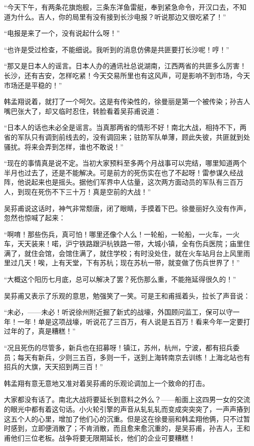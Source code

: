 \par “今天下午，有两条花旗炮舰，三条东洋鱼雷艇，奉到紧急命令，开汉口去，不知道为什么。吉人，你的局里有没有接到长沙电报？听说那边又很吃紧了！”
\par “电报是来了一个，没有说起什么呀！”
\par “也许是受过检查，不能细说。我听到的消息仿佛是共匪要打长沙呢！哼！”
\par “那又是日本人的谣言。日本人办的通讯社总说湖南，江西两省的共匪多么厉害！长沙，还有吉安，怎样吃紧！今天交易所里也有这风声，可是影响不到市场，今天市场还是平稳的！”
\par 韩孟翔说着，就打了一个呵欠。这是有传染性的，徐曼丽是第一个被传染；孙吉人嘴巴张大了，却又临时忍住，转脸看着吴荪甫说道：
\par “日本人的话也未必全是谣言。当真那两省的情形不好！南北大战，相持不下，两省的军队只有调到前线去的，没有调回来；驻防军队单薄，顾此失彼，共匪就到处骚扰。将来会弄到怎样，谁也不敢说！”
\par “现在的事情真是说不定。当初大家预料至多两个月战事可以完结，哪里知道两个半月也过去了，还是不能解决。可是前方的死伤实在也了不起呀！雷参谋久经战阵，他说起来也是摇头。据他们军界中人估量，这次两方面动员的军队有三百万人，到现在死伤不下三十万！真是空前的大战！”
\par 吴荪甫说这话时，神气非常颓唐，闭了眼睛，手摸着下巴。徐曼丽好久没有作声，忽然也惊喊了起来：
\par “啊唷！那些伤兵，真可怕！哪里还像个人么！一轮船，一轮船，一火车，一火车，天天装来！喏，沪宁铁路跟沪杭铁路一带，大城小镇，全有伤兵医院；庙里住满了，就住会馆，会馆住满了，就住学校；有时没处住，就在火车站月台上风里雨里过几天！唉，上有天堂，下有苏杭；现在苏杭一带，就变做了伤兵世界了！”
\par “大概这个阳历七月底，总可以解决了罢？死伤那么重，不能拖延得很久的！”
\par 吴荪甫又表示了乐观的意思，勉强笑了一笑。可是王和甫摇着头，拉长了声音说：
\par “未必，——未必！听说徐州附近掘了新式的战壕，外国顾问监工，保可以守一年！一年！单是这项战壕，听说花了三百万，有人说是五百万！看来今年一定要打过年的了，真是糟糕！”
\par “况且死伤的尽管多，新兵也在招募呀！镇江，苏州，杭州，宁波，都有招兵委员；每天有新兵，少则三五百，多则一千，送到上海转南京去训练！上海北站也有招兵的大旗，天天招到两三百！”
\par 韩孟翔有意无意地又准对着吴荪甫的乐观论调加上一个致命的打击。
\par 大家都没有话了。南北大战将要延长到意料之外么？——船面上这四男一女的交流的眼光中都有着这句话。小火轮引擎的声音从轧轧轧而变成突突突了，一声声摏到这五个人的心里，增加了他们心的沉重。但是这在徐曼丽和韩孟翔他俩，只不过暂时感到，立即便消散了；不肯消散，而且愈来愈沉重的，是吴荪甫，孙吉人，王和甫他们三位老板。战争将要无限期延长，他们的企业可要糟糕！
